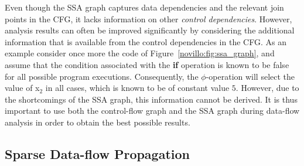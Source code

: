 Even though the SSA graph captures data dependencies and the relevant join
points in the CFG, it lacks information on other
\emph{control dependencies}. However, analysis results can often be improved
significantly by considering the additional information that is available from
the control dependencies in the CFG. As an example consider once more
the code of Figure~\ref{novillo:fig:ssa_graph}, and assume that the
condition associated with the \textbf{if} operation is known to be false for all
possible program executions. Consequently, the $\phi$-operation will select the
value of x$_2$ in all cases, which is known to be of constant value $5$.
However, due to the shortcomings of the SSA graph, this information cannot be
derived. It is thus important to use both the control-flow graph and the SSA
graph during data-flow analysis in order to obtain the best possible results.

\subsection{Sparse Data-flow Propagation}

